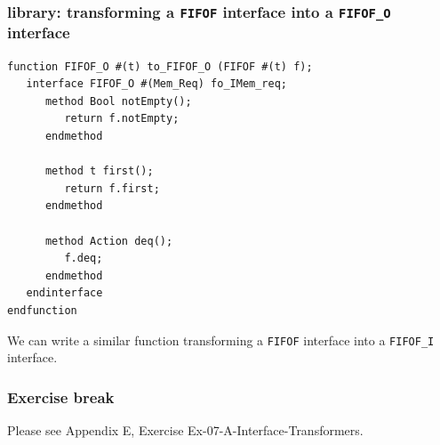 \begin{frame}[fragile]
\frametitle{{\BSV} library: transforming a {\tt FIFOF} interface into a {\tt FIFOF\_O} interface}

\footnotesize

\begin{Verbatim}[frame=single]
function FIFOF_O #(t) to_FIFOF_O (FIFOF #(t) f);
   interface FIFOF_O #(Mem_Req) fo_IMem_req;
      method Bool notEmpty();
         return f.notEmpty;
      endmethod

      method t first();
         return f.first;
      endmethod

      method Action deq();
         f.deq;
      endmethod
   endinterface
endfunction
\end{Verbatim}

\PAUSE{\vspace{4ex}}

We can write a similar function transforming a {\tt FIFOF} interface
into a {\tt FIFOF\_I} interface.

\end{frame}


\begin{frame}
\frametitle{\EmojiExercise \hmm Exercise break}

Please see Appendix E, Exercise Ex-07-A-Interface-Transformers.

\end{frame}


